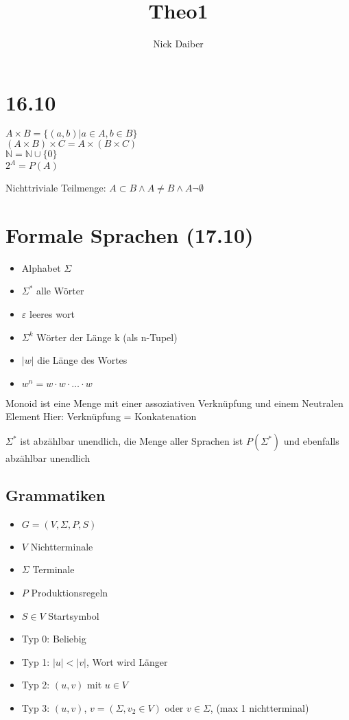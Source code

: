 \documentclass{article}
\title{Theo1}
\author{Nick Daiber}
\begin{document}
\maketitle
\section{16.10}
$A\times B = \{(a,b) | a\in A, b\in B\}$\\
$(A\times B) \times C = A \times (B \times C)$\\
$\mathbb N = \mathbb N \cup \{0\}$\\
$2^A = P(A)$

Nichttriviale Teilmenge: $A\subset B \land A \neq B \land A \neg \emptyset$\\

\section{Formale Sprachen (17.10)}
\begin{itemize}
	\item{Alphabet $\Sigma$}
	\item{$\Sigma^*$ alle Wörter}
	\item{$\varepsilon$ leeres wort}
	\item{$\Sigma^k$ Wörter der Länge k (als n-Tupel)}
	\item{$|w|$ die Länge des Wortes}
	\item{$w^n = w\cdot w \cdot \hdots \cdot w$}
\end{itemize}
Monoid ist eine Menge mit einer assoziativen Verknüpfung und einem Neutralen Element
Hier: Verknüpfung = Konkatenation

$\Sigma^*$ ist abzählbar unendlich, die Menge aller Sprachen ist $P(\Sigma^*)$ und ebenfalls
abzählbar unendlich

\subsection{Grammatiken}
\begin{itemize}
	\item {$G=(V,\Sigma,P,S)$}
	\item{$V$ Nichtterminale}
	\item{$\Sigma$ Terminale}
	\item{$P$ Produktionsregeln}
	\item{$S\in V$ Startsymbol}
	\item{Typ 0: Beliebig}
	\item{Typ 1: $|u| < |v|$, Wort wird Länger}
	\item{Typ 2: $(u,v)$ mit $u \in V$}
	\item{Typ 3: $(u,v)$, $v = (\Sigma, v_2 \in V)$ oder $v \in \Sigma$, (max 1 nichtterminal)}
\end{itemize}
\end{document}
